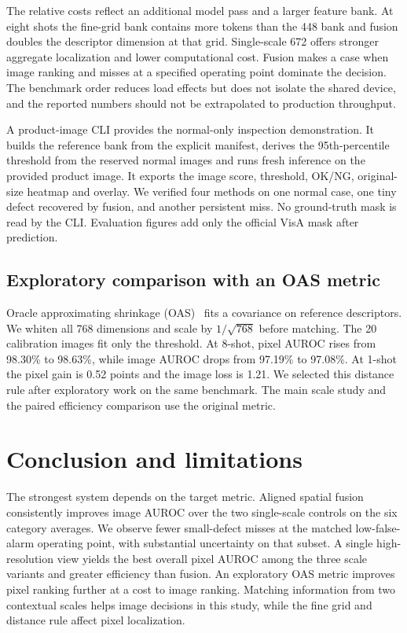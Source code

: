 \documentclass[10pt,twocolumn,letterpaper]{article}
\begin{document}
The relative costs reflect an additional model pass and a larger feature bank. At eight shots the fine-grid bank contains more tokens than the 448 bank and fusion doubles the descriptor dimension at that grid. Single-scale 672 offers stronger aggregate localization and lower computational cost. Fusion makes a case when image ranking and misses at a specified operating point dominate the decision. The benchmark order reduces load effects but does not isolate the shared device, and the reported numbers should not be extrapolated to production throughput.

A product-image CLI provides the normal-only inspection demonstration. It builds the reference bank from the explicit manifest, derives the 95th-percentile threshold from the reserved normal images and runs fresh inference on the provided product image. It exports the image score, threshold, OK/NG, original-size heatmap and overlay. We verified four methods on one normal case, one tiny defect recovered by fusion, and another persistent miss. No ground-truth mask is read by the CLI. Evaluation figures add only the official VisA mask after prediction.

\subsection{Exploratory comparison with an OAS metric}
Oracle approximating shrinkage (OAS)~\cite{chen2010oas} fits a covariance on reference descriptors. We whiten all 768 dimensions and scale by $1/\sqrt{768}$ before matching. The 20 calibration images fit only the threshold. At 8-shot, pixel AUROC rises from 98.30\% to 98.63\%, while image AUROC drops from 97.19\% to 97.08\%. At 1-shot the pixel gain is 0.52 points and the image loss is 1.21. We selected this distance rule after exploratory work on the same benchmark. The main scale study and the paired efficiency comparison use the original metric.

\section{Conclusion and limitations}
The strongest system depends on the target metric. Aligned spatial fusion consistently improves image AUROC over the two single-scale controls on the six category averages. We observe fewer small-defect misses at the matched low-false-alarm operating point, with substantial uncertainty on that subset. A single high-resolution view yields the best overall pixel AUROC among the three scale variants and greater efficiency than fusion. An exploratory OAS metric improves pixel ranking further at a cost to image ranking. Matching information from two contextual scales helps image decisions in this study, while the fine grid and distance rule affect pixel localization.
\end{document}
